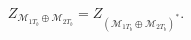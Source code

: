 \begin{equation}
Z_{\mathcal{M}_{1T_{b}}\oplus \mathcal{M}_{2T_{b}}}=Z_{(\mathcal{M}%
_{1T_{b}}\oplus \mathcal{M}_{2T_{b}})^{\ast }}.  \label{49}
\end{equation}


